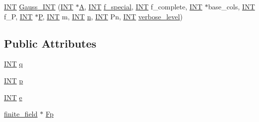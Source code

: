 \begin{DoxyCompactItemize}
\item 
\mbox{\hyperlink{galois_8h_a09fddde158a3a20bd2dcadb609de11dc}{I\+NT}} \mbox{\hyperlink{classfinite__ring_a1cf1d7300f1fbfa20b10e0e4ef1139b5}{Gauss\+\_\+\+I\+NT}} (\mbox{\hyperlink{galois_8h_a09fddde158a3a20bd2dcadb609de11dc}{I\+NT}} $\ast$\mbox{\hyperlink{simeon_8_c_a97833f04c3a9c008df5521a2fc291bb4}{A}}, \mbox{\hyperlink{galois_8h_a09fddde158a3a20bd2dcadb609de11dc}{I\+NT}} \mbox{\hyperlink{simeon_8_c_a5c9bb19da4c942e41c1d5cfc81f4cfd7}{f\+\_\+special}}, \mbox{\hyperlink{galois_8h_a09fddde158a3a20bd2dcadb609de11dc}{I\+NT}} f\+\_\+complete, \mbox{\hyperlink{galois_8h_a09fddde158a3a20bd2dcadb609de11dc}{I\+NT}} $\ast$base\+\_\+cols, \mbox{\hyperlink{galois_8h_a09fddde158a3a20bd2dcadb609de11dc}{I\+NT}} f\+\_\+P, \mbox{\hyperlink{galois_8h_a09fddde158a3a20bd2dcadb609de11dc}{I\+NT}} $\ast$\mbox{\hyperlink{simeon_8_c_a7fa15551e800919e93401fbbcd8e71e8}{P}}, \mbox{\hyperlink{galois_8h_a09fddde158a3a20bd2dcadb609de11dc}{I\+NT}} m, \mbox{\hyperlink{galois_8h_a09fddde158a3a20bd2dcadb609de11dc}{I\+NT}} \mbox{\hyperlink{simeon_8_c_a7f2cd26777ce0ff3fdaf8d02aacbddfb}{n}}, \mbox{\hyperlink{galois_8h_a09fddde158a3a20bd2dcadb609de11dc}{I\+NT}} Pn, \mbox{\hyperlink{galois_8h_a09fddde158a3a20bd2dcadb609de11dc}{I\+NT}} \mbox{\hyperlink{simeon_8_c_a818073fbcc2f439e7c56952f67386122}{verbose\+\_\+level}})
\end{DoxyCompactItemize}
\subsection*{Public Attributes}
\begin{DoxyCompactItemize}
\item 
\mbox{\hyperlink{galois_8h_a09fddde158a3a20bd2dcadb609de11dc}{I\+NT}} \mbox{\hyperlink{classfinite__ring_a3c2ea6f3a5c83681ce5284ac2860b576}{q}}
\item 
\mbox{\hyperlink{galois_8h_a09fddde158a3a20bd2dcadb609de11dc}{I\+NT}} \mbox{\hyperlink{classfinite__ring_a8ba25b50394b4ac5687dfb2fd3b7cd23}{p}}
\item 
\mbox{\hyperlink{galois_8h_a09fddde158a3a20bd2dcadb609de11dc}{I\+NT}} \mbox{\hyperlink{classfinite__ring_a985ce2ecd32e33bf29c8949e7038c003}{e}}
\item 
\mbox{\hyperlink{classfinite__field}{finite\+\_\+field}} $\ast$ \mbox{\hyperlink{classfinite__ring_aa586a1bbe1cbf4c20a2f2b8d530c3352}{Fp}}
\end{DoxyCompactItemize}
